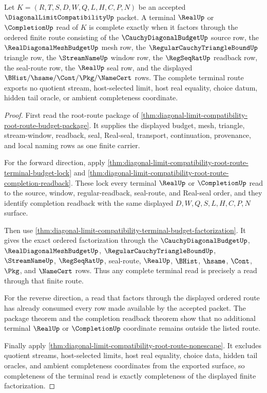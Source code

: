 \begin{theorem}
\label{thm:diagonal-limit-compatibility-terminal-route-completeness}
Let $K=(R,T,S,D,W,Q,L,H,C,P,N)$ be an accepted $\DiagonalLimitCompatibilityUp$ packet. A terminal $\RealUp$ or $\CompletionUp$ read of $K$ is complete exactly when it factors through the ordered finite route consisting of the $\CauchyDiagonalBudgetUp$ source row, the $\RealDiagonalMeshBudgetUp$ mesh row, the $\RegularCauchyTriangleBoundUp$ triangle row, the $\StreamNameUp$ window row, the $\RegSeqRatUp$ readback row, the seal-route row, the $\RealUp$ seal row, and the displayed $\BHist/\hsame/\Cont/\Pkg/\NameCert$ rows. The complete terminal route exports no quotient stream, host-selected limit, host real equality, choice datum, hidden tail oracle, or ambient completeness coordinate.
\end{theorem}
\begin{proof}
First read the root-route package of \autoref{thm:diagonal-limit-compatibility-root-route-budget-package}. It supplies the displayed budget, mesh, triangle, stream-window, readback, seal, Real-seal, transport, continuation, provenance, and local naming rows as one finite carrier.

For the forward direction, apply \autoref{thm:diagonal-limit-compatibility-root-route-terminal-budget-lock} and \autoref{thm:diagonal-limit-compatibility-root-route-completion-readback}. These lock every terminal $\RealUp$ or $\CompletionUp$ read to the source, window, regular-readback, seal-route, and Real-seal order, and they identify completion readback with the same displayed $D,W,Q,S,L,H,C,P,N$ surface.

Then use \autoref{thm:diagonal-limit-compatibility-terminal-budget-factorization}. It gives the exact ordered factorization through the $\CauchyDiagonalBudgetUp$, $\RealDiagonalMeshBudgetUp$, $\RegularCauchyTriangleBoundUp$, $\StreamNameUp$, $\RegSeqRatUp$, seal-route, $\RealUp$, $\BHist$, $\hsame$, $\Cont$, $\Pkg$, and $\NameCert$ rows. Thus any complete terminal read is precisely a read through that finite route.

For the reverse direction, a read that factors through the displayed ordered route has already consumed every row made available by the accepted packet. The package theorem and the completion readback theorem show that no additional terminal $\RealUp$ or $\CompletionUp$ coordinate remains outside the listed route.

Finally apply \autoref{thm:diagonal-limit-compatibility-root-route-nonescape}. It excludes quotient streams, host-selected limits, host real equality, choice data, hidden tail oracles, and ambient completeness coordinates from the exported surface, so completeness of the terminal read is exactly completeness of the displayed finite factorization.
\end{proof}

